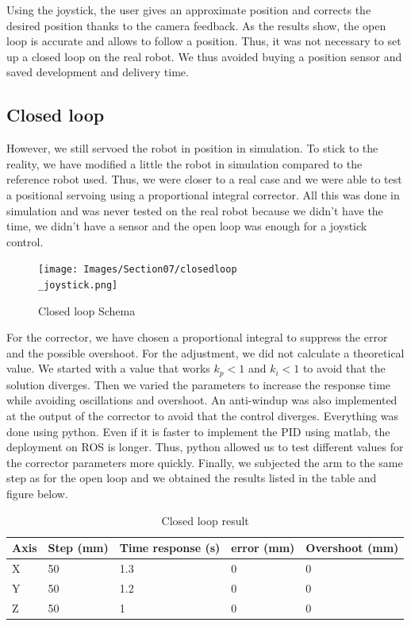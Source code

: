 \bigbreak
Using the joystick, the user gives an approximate position and corrects the desired position thanks to the camera feedback. As the results show, the open loop is accurate and allows to follow a position. Thus, it was not necessary to set up a closed loop on the real robot. We thus avoided buying a position sensor and saved development and delivery time.

\subsection{Closed loop}

However, we still servoed the robot in position in simulation. To stick to the reality, we have modified a little the robot in simulation compared to the reference robot used. Thus, we were closer to a real case and we were able to test a positional servoing using a proportional integral corrector. All this was done in simulation and was never tested on the real robot because we didn't have the time, we didn't have a sensor and the open loop was enough for a joystick control.
\begin{figure}[H]
    \centering
    \texttt{[image: Images/Section07/closedloop\\\_joystick.png]}
    \caption{Closed loop Schema}
    \label{fig:ClosedLoopSchema}
\end{figure}

For the corrector, we have chosen a proportional integral to suppress the error and the possible overshoot. For the adjustment, we did not calculate a theoretical value. We started with a value that works $k_p\less 1$ and $k_i\less 1$ to avoid that the solution diverges. Then we varied the parameters to increase the response time while avoiding oscillations and overshoot. An anti-windup was also implemented at the output of the corrector to avoid that the control diverges. Everything was done using python. Even if it is faster to implement the PID using matlab, the deployment on ROS is longer. Thus, python allowed us to test different values for the corrector parameters more quickly. Finally, we subjected the arm to the same step as for the open loop and we obtained the results listed in the table and figure below.
\begin{table}[ht]
    \centering
    \begin{tabular}{|p{1cm} | p{2.3cm} | p{3.5cm} | p{2.3cm}| p{3.3cm} |} 
        \hline
        \textbf{Axis} & \textbf{Step (mm)} &\textbf{Time response (s)} & \textbf{error (mm)} & \textbf{Overshoot (mm)}\\ [0.3ex]
        \hline
        X & 50 & 1.3 & 0 & 0 \\ 
        \hline
        Y & 50 & 1.2 & 0 & 0 \\ 
        \hline
        Z & 50 & 1 & 0 & 0 \\ 
        \hline
    \end{tabular}
    \caption{Closed loop result}
\end{table}
\FloatBarrier

